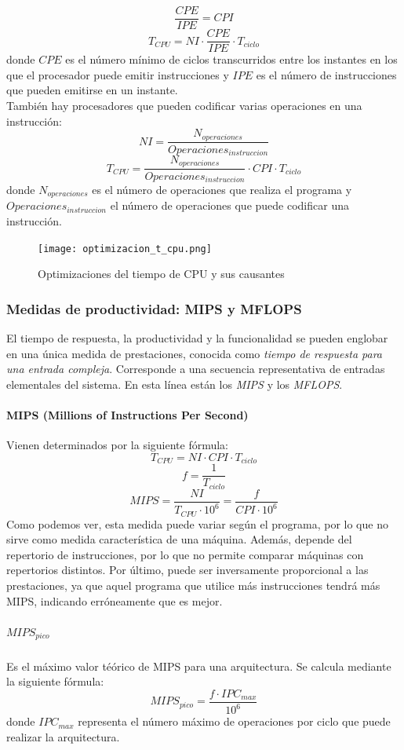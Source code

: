 \documentclass[12pt,spanish]{article}
\begin{document}
\[\frac{CPE}{IPE}=CPI\] 	
\begin{equation}
T_{CPU}=NI \cdot \frac{CPE}{IPE} \cdot T_{ciclo}
\end{equation}
donde $CPE$ es el número mínimo de ciclos transcurridos entre los instantes en los que el procesador puede emitir instrucciones y $IPE$ es el número de instrucciones que pueden emitirse en un instante.\\
También hay procesadores que pueden codificar varias operaciones en una instrucción:
\[NI=\frac{N_{operaciones}}{Operaciones_{instruccion}}\]
\begin{equation}
T_{CPU}=\frac{N_{operaciones}}{Operaciones_{instruccion}} \cdot CPI \cdot T_{ciclo}
\end{equation}
donde $N_{operaciones}$ es el número de operaciones que realiza el programa y $Operaciones_{instruccion}$ el número de operaciones que puede codificar una instrucción.
\begin{figure}[H]
\centering
\texttt{[image: optimizacion\_t\_cpu.png]}
\caption{Optimizaciones del tiempo de CPU y sus causantes}
\end{figure}
\subsubsection{Medidas de productividad: MIPS y MFLOPS}
El tiempo de respuesta, la productividad y la funcionalidad se pueden englobar en una única medida de prestaciones, conocida como \emph{tiempo de respuesta para una entrada compleja}. Corresponde a una secuencia representativa de entradas elementales del sistema. En esta línea están los \emph{MIPS} y los \emph{MFLOPS}.
\paragraph{MIPS (Millions of Instructions Per Second)}
Vienen determinados por la siguiente fórmula:
\[T_{CPU}=NI \cdot CPI \cdot T_{ciclo} \]
\[f=\frac{1}{T_{ciclo}} \]
\begin{equation}
MIPS=\frac{NI}{T_{CPU} \cdot 10^6}=\frac{f}{CPI \cdot 10^6}
\end{equation}
Como podemos ver, esta medida puede variar según el programa, por lo que no sirve como medida característica de una máquina. Además, depende del repertorio de instrucciones, por lo que no permite comparar máquinas con repertorios distintos. Por último, puede ser inversamente proporcional a las prestaciones, ya que aquel programa que utilice más instrucciones tendrá más MIPS, indicando erróneamente que es mejor.
\subparagraph{\boldmath $MIPS_{pico}$}
Es el máximo valor téórico de MIPS para una arquitectura. Se calcula mediante la siguiente fórmula:
\begin{equation}
MIPS_{pico}=\frac{f \cdot IPC_{max}}{10^6}
\end{equation}
donde $IPC_{max}$ representa el número máximo de operaciones por ciclo que puede realizar la arquitectura.
\end{document}
